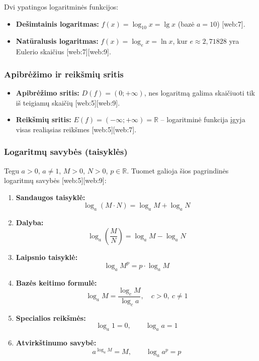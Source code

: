 \begin{remark}
Dvi ypatingos logaritminės funkcijos:
\begin{itemize}
  \item \textbf{Dešimtainis logaritmas:} $f(x) = \log_{10} x = \lg x$ (bazė $a = 10$) [web:7].
  \item \textbf{Natūralusis logaritmas:} $f(x) = \log_e x = \ln x$, kur $e \approx 2{,}71828$ yra Eulerio skaičius [web:7][web:9].
\end{itemize}
\end{remark}

\subsubsection*{Apibrėžimo ir reikšmių sritis}

\begin{itemize}
  \item \textbf{Apibrėžimo sritis:} $D(f) = (0; +\infty)$, nes logaritmą galima skaičiuoti tik iš teigiamų skaičių [web:5][web:9].
  \item \textbf{Reikšmių sritis:} $E(f) = (-\infty; +\infty) = \mathbb{R}$ – logaritminė funkcija įgyja visas realiąsias reikšmes [web:5][web:7].
\end{itemize}

\subsubsection*{Logaritmų savybės (taisyklės)}

Tegu $a > 0$, $a \neq 1$, $M > 0$, $N > 0$, $p \in \mathbb{R}$. Tuomet galioja šios pagrindinės logaritmų savybės [web:5][web:9]:

\begin{tcolorbox}[title={Pagrindinės logaritmų savybės}]
\begin{enumerate}[label=\arabic*.]
  \item \textbf{Sandaugos taisyklė:}
  \[
    \log_a(M \cdot N) = \log_a M + \log_a N
  \]
  \item \textbf{Dalyba:}
  \[
    \log_a\!\left(\frac{M}{N}\right) = \log_a M - \log_a N
  \]
  \item \textbf{Laipsnio taisyklė:}
  \[
    \log_a M^p = p \cdot \log_a M
  \]
  \item \textbf{Bazės keitimo formulė:}
  \[
    \log_a M = \frac{\log_c M}{\log_c a}, \quad c > 0,\ c \neq 1
  \]
  \item \textbf{Specialios reikšmės:}
  \[
    \log_a 1 = 0, \qquad \log_a a = 1
  \]
  \item \textbf{Atvirkštinumo savybė:}
  \[
    a^{\log_a M} = M, \qquad \log_a a^p = p
  \]
\end{enumerate}
\end{tcolorbox}

